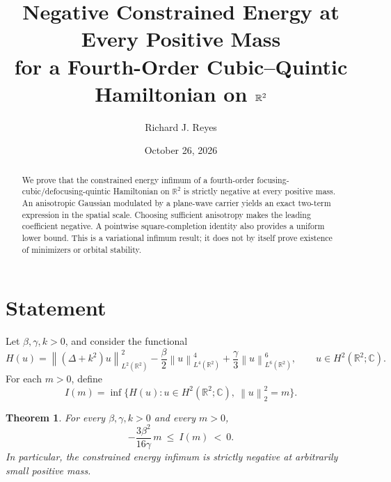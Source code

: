 \documentclass[11pt]{article}
\title{Negative Constrained Energy at Every Positive Mass\\
for a Fourth-Order Cubic--Quintic Hamiltonian on $\R^2$}
\author{Richard J. Reyes}
\date{October 26, 2026}
\newtheorem{theorem}{Theorem}
\newcommand{\R}{\mathbb{R}}
\newcommand{\C}{\mathbb{C}}
\newcommand{\norm}[1]{\left\lVert #1\right\rVert}
\begin{document}
\maketitle

\begin{abstract}
We prove that the constrained energy infimum of a fourth-order
focusing-cubic/defocusing-quintic Hamiltonian on $\R^2$ is strictly
negative at every positive mass. An anisotropic Gaussian modulated by
a plane-wave carrier yields an exact two-term expression in the
spatial scale. Choosing sufficient anisotropy makes the leading
coefficient negative. A pointwise square-completion identity also
provides a uniform lower bound. This is a variational infimum result;
it does not by itself prove existence of minimizers or orbital stability.
\end{abstract}

\section{Statement}
Let $\beta,\gamma,k>0$, and consider the functional
\begin{equation}\label{eq:H}
 H(u)=\norm{(\Delta+k^2)u}_{L^2(\R^2)}^2
 -\frac{\beta}{2}\norm{u}_{L^4(\R^2)}^4
 +\frac{\gamma}{3}\norm{u}_{L^6(\R^2)}^6,
 \qquad u\in H^2(\R^2;\C).
\end{equation}
For each $m>0$, define
\begin{equation}\label{eq:I}
 I(m)=\inf\bigl\{H(u):u\in H^2(\R^2;\C),\ \norm{u}_2^2=m\bigr\}.
\end{equation}

\begin{theorem}\label{thm:negativity}
For every $\beta,\gamma,k>0$ and every $m>0$,
\begin{equation}\label{eq:main}
 \boxed{-\frac{3\beta^2}{16\gamma}\,m\ \le\ I(m)\ <\ 0.}
\end{equation}
In particular, the constrained energy infimum is strictly negative at
arbitrarily small positive mass.
\end{theorem}
\end{document}
